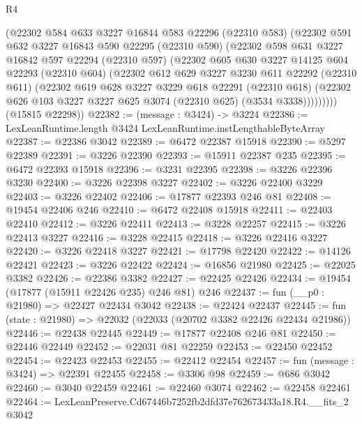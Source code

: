 \begin{lexlean}{R4}
\begin{coremodule}
        (@22302
          @584
          @633
          @3227
          @16844
          @583
          @22296
          (@22310 @583)
          (@22302
            @591
            @632
            @3227
            @16843
            @590
            @22295
            (@22310 @590)
            (@22302
              @598
              @631
              @3227
              @16842
              @597
              @22294
              (@22310 @597)
              (@22302
                @605
                @630
                @3227
                @14125
                @604
                @22293
                (@22310 @604)
                (@22302
                  @612
                  @629
                  @3227
                  @3230
                  @611
                  @22292
                  (@22310 @611)
                  (@22302
                    @619
                    @628
                    @3227
                    @3229
                    @618
                    @22291
                    (@22310 @618)
                    (@22302 @626 @103 @3227 @3227 @625 @3074 (@22310 @625) (@3534 @3338)))))))))
      (@15815 @22298))
@22382 := (message : @3424) -> @3224
@22386 := LexLeanRuntime.length @3424 LexLeanRuntime.instLengthableByteArray
@22387 := @22386 @3042
@22389 := @6472 @22387 @15918
@22390 := @5297 @22389
@22391 := @3226 @22390
@22393 := @15911 @22387 @235
@22395 := @6472 @22393 @15918
@22396 := @3231 @22395
@22398 := @3226 @22396 @3230
@22400 := @3226 @22398 @3227
@22402 := @3226 @22400 @3229
@22403 := @3226 @22402
@22406 := @17877 @22393 @246 @81
@22408 := @19454 @22406 @246
@22410 := @6472 @22408 @15918
@22411 := @22403 @22410
@22412 := @3226 @22411
@22413 := @3228 @22257
@22415 := @3226 @22413 @3227
@22416 := @3228 @22415
@22418 := @3226 @22416 @3227
@22420 := @3226 @22418 @3227
@22421 := @17798 @22420
@22422 := @14126 @22421
@22423 := @3226 @22422
@22424 := @16856 @21980
@22425 := @22025 @3382
@22426 := @22386 @3382
@22427 := @22425 @22426
@22434 := @19454 (@17877 (@15911 @22426 @235) @246 @81) @246
@22437 := fun (__p0 : @21980) => @22427 @22434 @3042
@22438 := @22424 @22437
@22445 := fun (state : @21980) => @22032 (@22033 (@20702 @3382 @22426 @22434 @21986))
@22446 := @22438 @22445
@22449 := @17877 @22408 @246 @81
@22450 := @22446 @22449
@22452 := @22031 @81 @22259
@22453 := @22450 @22452
@22454 := @22423 @22453
@22455 := @22412 @22454
@22457 := fun (message : @3424) => @22391 @22455
@22458 := @3306 @98
@22459 := @686 @3042
@22460 := @3040 @22459
@22461 := @22460 @3074
@22462 := @22458 @22461
@22464 := LexLeanPreserve.Cd67446b7252fb2dfd37e762673433a18.R4.__fits_2 @3042

\end{coremodule}
\end{lexlean}
